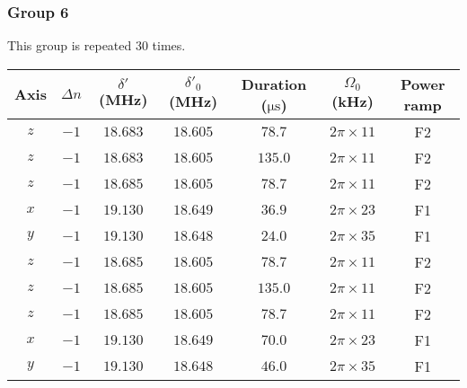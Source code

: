 \newpage
\subsubsection{Group 6}
This group is repeated 30 times.
\begin{center}
  \begin{tabular}{|c|c|c|c|c|c|c|}
    \hline
    Axis&$\Delta n$&$\delta'$ (MHz)&$\delta'_0$ (MHz)&Duration ($\mathrm{\mu s}$)& $\Omega_0$ (kHz)&Power ramp\\\hline
    $z$&$-1$&$18.683$&$18.605$&$78.7$&$2\pi\times11$&F2\\\hline
    $z$&$-1$&$18.683$&$18.605$&$135.0$&$2\pi\times11$&F2\\\hline
    $z$&$-1$&$18.685$&$18.605$&$78.7$&$2\pi\times11$&F2\\\hline
    $x$&$-1$&$19.130$&$18.649$&$36.9$&$2\pi\times23$&F1\\\hline
    $y$&$-1$&$19.130$&$18.648$&$24.0$&$2\pi\times35$&F1\\\hline
    $z$&$-1$&$18.685$&$18.605$&$78.7$&$2\pi\times11$&F2\\\hline
    $z$&$-1$&$18.685$&$18.605$&$135.0$&$2\pi\times11$&F2\\\hline
    $z$&$-1$&$18.685$&$18.605$&$78.7$&$2\pi\times11$&F2\\\hline
    $x$&$-1$&$19.130$&$18.649$&$70.0$&$2\pi\times23$&F1\\\hline
    $y$&$-1$&$19.130$&$18.648$&$46.0$&$2\pi\times35$&F1\\\hline
  \end{tabular}
\end{center}
